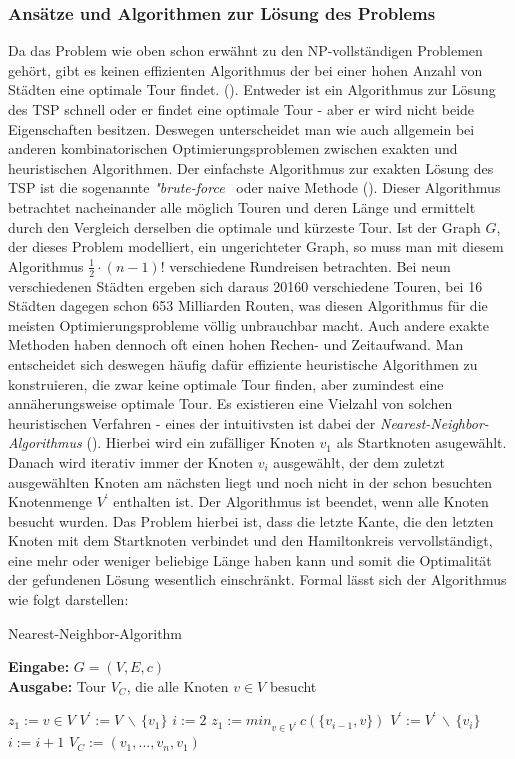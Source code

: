 \documentclass[doktyp=barbeit, sprache=german]{TUBAFarbeiten}
\begin{document}
\subsubsection{Ansätze und Algorithmen zur Lösung des Problems}
Da das Problem wie oben schon erwähnt zu den NP-vollständigen Problemen gehört, gibt es keinen effizienten Algorithmus der bei einer hohen Anzahl von Städten eine optimale Tour findet. (\cite[p.~150]{TSP}). Entweder ist ein Algorithmus zur Lösung des TSP schnell oder er findet eine optimale Tour - aber er wird nicht beide Eigenschaften besitzen. Deswegen unterscheidet man wie auch allgemein bei anderen kombinatorischen Optimierungsproblemen zwischen exakten und heuristischen Algorithmen.
Der einfachste Algorithmus zur exakten Lösung des TSP ist die sogenannte \textit{"brute-force\grqq} \, oder naive Methode (\cite{TaschenbuchAlgorithmen}). Dieser Algorithmus betrachtet nacheinander alle möglich Touren und deren Länge und ermittelt durch den Vergleich derselben die optimale und kürzeste Tour. 
Ist der Graph \(G\), der dieses Problem modelliert, ein ungerichteter Graph, so muss man mit diesem Algorithmus \(\frac{1}{2} \cdot (n - 1)!\) verschiedene Rundreisen betrachten. Bei neun verschiedenen Städten ergeben sich daraus 20160 verschiedene Touren, bei 16 Städten dagegen schon 653 Milliarden Routen, was diesen Algorithmus für die meisten Optimierungsprobleme völlig unbrauchbar macht. Auch andere exakte Methoden haben dennoch oft einen hohen Rechen- und Zeitaufwand. Man entscheidet sich deswegen häufig dafür effiziente heuristische Algorithmen zu konstruieren, die zwar keine optimale Tour finden, aber zumindest eine annäherungsweise optimale Tour. Es existieren eine Vielzahl von solchen heuristischen Verfahren - eines der intuitivsten ist dabei der \textit{Nearest-Neighbor-Algorithmus} (\cite{Lotz2014}). Hierbei wird ein zufälliger Knoten $v_1$ als Startknoten asugewählt. Danach wird iterativ immer der Knoten $v_i$ ausgewählt, der dem zuletzt ausgewählten Knoten am nächsten liegt und noch nicht in der schon besuchten Knotenmenge $V^\prime$ enthalten ist. Der Algorithmus ist beendet, wenn alle Knoten besucht wurden. Das Problem hierbei ist, dass die letzte Kante, die den letzten Knoten mit dem Startknoten verbindet und den Hamiltonkreis vervollständigt, eine mehr oder weniger beliebige Länge haben kann und somit die Optimalität der gefundenen Lösung wesentlich einschränkt. Formal lässt sich der Algorithmus wie folgt darstellen: 
\begin{algorithm}
\caption{Nearest-Neighbor-Algorithm}
\label{euclid}
\textbf{Eingabe:} $G = (V,E,c)$
\\\textbf{Ausgabe:} Tour $V_C$, die alle Knoten $v \in V$ besucht
\begin{algorithmic}[1]
\State $z_1 := v \in V$
\State $V^\prime := V \, \backslash \, \{v_1\}$
\State $i := 2$
\State $z_1 := min_{v\in V^\prime}  \, c(\{v_{i-1},v\})$
\State $V^\prime := V^\prime \, \backslash \, \{v_i\}$
\State $i := i +1 $
\EndWhile
\State $V_C := (v_1,...,v_n,v_1)$
\end{algorithmic}
\end{algorithm}
\end{document}
